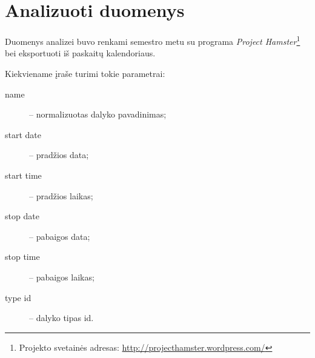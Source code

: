 \chapter{Analizuoti duomenys}

Duomenys analizei buvo renkami semestro metu su programa \emph{Project 
Hamster}\footnote{
Projekto svetainės adresas: \url{http://projecthamster.wordpress.com/}}
bei eksportuoti iš paskaitų kalendoriaus.

Kiekviename įraše turimi tokie parametrai:
\begin{description}
  \item[name] – normalizuotas dalyko pavadinimas;
  \item[start date] – pradžios data;
  \item[start time] – pradžios laikas;
  \item[stop date] – pabaigos data;
  \item[stop time] – pabaigos laikas;
  \item[type id] – dalyko tipas id.
\end{description}
